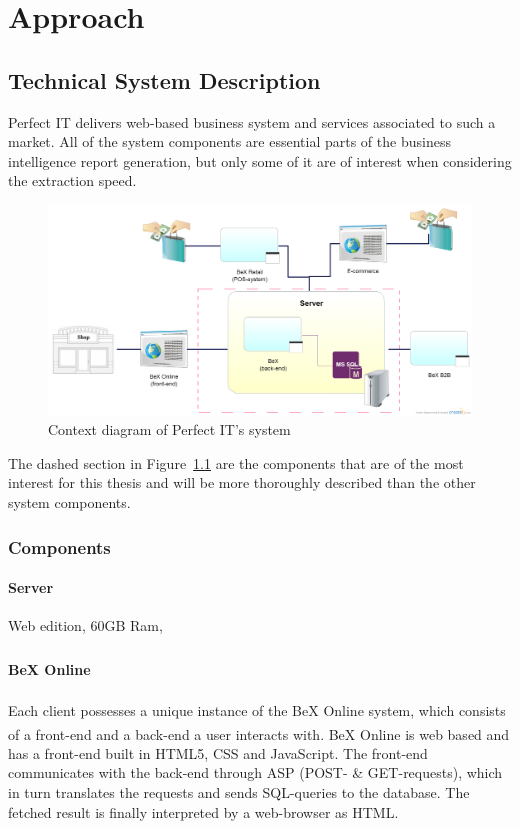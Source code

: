 \documentclass{cslthse-msc}
\begin{document}
\chapter{Approach}

\section{Technical System Description}
Perfect IT delivers web-based business system and services associated to such a market. All of the system components are essential parts of the business intelligence report generation, but only some of it are of interest when considering the extraction speed.
\begin{figure}[H]
\vspace{-15pt}
  \begin{center}
    \includegraphics[scale=0.3]{Systemdesc.png}
  \end{center}
  \caption{Context diagram of Perfect IT's system}
  \label{context}
  \vspace{-15pt}
\end{figure}
\noindent The dashed section in Figure~\ref{context} are the components that are of the most interest for this thesis and will be more thoroughly described than the other system components.

\subsection{Components}


\subsubsection{Server}
Web edition, 60GB Ram, 
\subsubsection{BeX\textsuperscript{\textregistered} Online}
Each client possesses a unique instance of the BeX\textsuperscript{\textregistered} Online system, which consists of a front-end and a back-end a user interacts with. BeX\textsuperscript{\textregistered} Online is web based and has a front-end built in HTML5, CSS and JavaScript. The front-end communicates with the back-end through ASP (POST- \& GET-requests), which in turn translates the requests and sends SQL-queries to the database. The fetched result is finally interpreted by a web-browser as HTML. 
\end{document}
